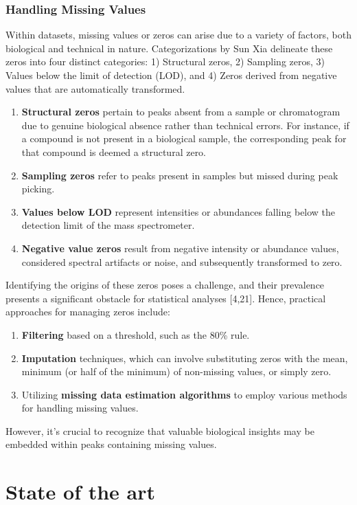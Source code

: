 \documentclass[ENG, BIB]{TFUOC}%
\begin{document}
\subsubsection{Handling Missing Values}
Within datasets, missing values or zeros can arise due to a variety of factors, both biological and technical in nature. Categorizations by Sun Xia delineate these zeros into four distinct categories: 1) Structural zeros, 2) Sampling zeros, 3) Values below the limit of detection (LOD), and 4) Zeros derived from negative values that are automatically transformed.
\begin{enumerate}
    \item \textbf{Structural zeros} pertain to peaks absent from a sample or chromatogram due to genuine biological absence rather than technical errors. For instance, if a compound is not present in a biological sample, the corresponding peak for that compound is deemed a structural zero.
    \item \textbf{Sampling zeros} refer to peaks present in samples but missed during peak picking.
    \item \textbf{Values below LOD} represent intensities or abundances falling below the detection limit of the mass spectrometer.
    \item \textbf{Negative value zeros} result from negative intensity or abundance values,
    considered spectral artifacts or noise, and subsequently transformed to zero.
\end{enumerate}

Identifying the origins of these zeros poses a challenge, and their prevalence presents a significant obstacle for statistical analyses [4,21]. Hence, practical approaches for managing zeros include:
\begin{enumerate}
    \item \textbf{Filtering} based on a threshold, such as the 80\% rule.
    \item \textbf{Imputation} techniques, which can involve substituting zeros with the mean, minimum (or half of the minimum) of non-missing values, or simply zero.
    \item Utilizing \textbf{missing data estimation algorithms} to employ various methods for handling missing values.
\end{enumerate}

However, it's crucial to recognize that valuable biological insights may be embedded within peaks containing missing values.


\section{State of the art}
\end{document}
